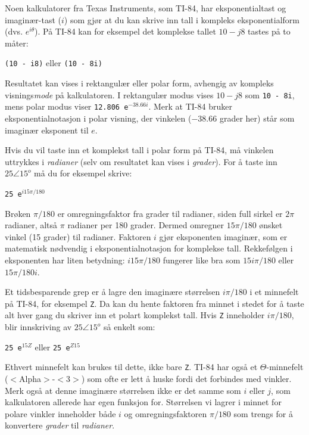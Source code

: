 \vskip 10pt

Noen kalkulatorer fra Texas Instruments, som TI-84, har eksponentialtast og imaginær-tast ($i$) som gjør at du kan skrive inn tall i kompleks eksponentialform (dvs. $e^{i \theta}$). På TI-84 kan for eksempel det komplekse tallet $10 - j8$ tastes på to måter:

\vskip 10pt

{\tt (10 - i8)} \hskip 10pt eller \hskip 10pt {\tt (10 - 8i)}

\vskip 10pt

Resultatet kan vises i rektangulær eller polar form, avhengig av kompleks visnings{\it mode} på kalkulatoren. I rektangulær modus vises $10 - j8$ som {\tt 10 - 8i}, mens polar modus viser {\tt 12.806 e$^{-38.66i}$}. Merk at TI-84 bruker eksponentialnotasjon i polar visning, der vinkelen ($-38.66$ grader her) står som imaginær eksponent til $e$.

\vskip 10pt

Hvis du vil taste inn et komplekst tall i polar form på TI-84, må vinkelen uttrykkes i {\it radianer} (selv om resultatet kan vises i {\it grader}). For å taste inn $25 \angle 15^o$ må du for eksempel skrive:

\vskip 10pt

{\tt 25 e$^{i15 \pi / 180}$}

\vskip 10pt

Brøken $\pi / 180$ er omregningsfaktor fra grader til radianer, siden full sirkel er $2\pi$ radianer, altså $\pi$ radianer per 180 grader. Dermed omregner $15 \pi / 180$ ønsket vinkel (15 grader) til radianer. Faktoren $i$ gjør eksponenten imaginær, som er matematisk nødvendig i eksponentialnotasjon for komplekse tall. Rekkefølgen i eksponenten har liten betydning: $i15 \pi / 180$ fungerer like bra som $15 i \pi / 180$ eller $15 \pi / 180 i$.

\vskip 10pt

Et tidsbesparende grep er å lagre den imaginære størrelsen $i \pi / 180$ i et minnefelt på TI-84, for eksempel {\tt Z}. Da kan du hente faktoren fra minnet i stedet for å taste alt hver gang du skriver inn et polart komplekst tall. Hvis {\tt Z} inneholder $i \pi / 180$, blir innskriving av $25 \angle 15^o$ så enkelt som:

\vskip 10pt

{\tt 25 e$^{15Z}$} \hskip 10pt eller \hskip 10pt {\tt 25 e$^{Z15}$}

\vskip 10pt

Ethvert minnefelt kan brukes til dette, ikke bare {\tt Z}. TI-84 har også et $\Theta$-minnefelt ($<$Alpha$>$-$<$3$>$) som ofte er lett å huske fordi det forbindes med vinkler. Merk også at denne imaginære størrelsen ikke er det samme som $i$ eller $j$, som kalkulatoren allerede har egen funksjon for. Størrelsen vi lagrer i minnet for polare vinkler inneholder både $i$ og omregningsfaktoren $\pi / 180$ som trengs for å konvertere {\it grader} til {\it radianer}.









